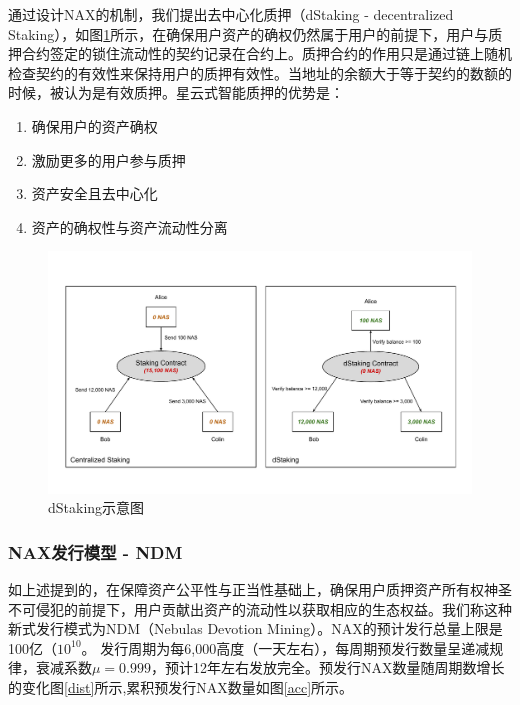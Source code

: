 通过设计NAX的机制，我们提出去中心化质押（dStaking - decentralized Staking），如图\ref{fig:dStaking}所示，在确保用户资产的确权仍然属于用户的前提下，用户与质押合约签定的锁住流动性的契约记录在合约上。质押合约的作用只是通过链上随机检查契约的有效性来保持用户的质押有效性。当地址的余额大于等于契约的数额的时候，被认为是有效质押。星云式智能质押的优势是：
\begin{enumerate}[\hspace{2cm}(a)]
    \item 确保用户的资产确权
    \item 激励更多的用户参与质押
    \item 资产安全且去中心化
    \item 资产的确权性与资产流动性分离
\end{enumerate}

\begin{figure}[htbp]
  \centering
    \includegraphics[width=1\textwidth]{../common/dStaking.pdf}
    \caption{dStaking示意图 \label{fig:dStaking}}
\end{figure}

\subsubsection{NAX发行模型 - NDM}
如上述提到的，在保障资产公平性与正当性基础上，确保用户质押资产所有权神圣不可侵犯的前提下，用户贡献出资产的流动性以获取相应的生态权益。我们称这种新式发行模式为NDM（Nebulas Devotion Mining）。NAX的预计发行总量上限是100亿（\(10^{10}\)。 发行周期为每6,000高度（一天左右），每周期预发行数量呈递减规律，衰减系数$\mu=0.999$，预计12年左右发放完全。预发行NAX数量随周期数增长的变化图\ref{dist}所示,累积预发行NAX数量如图\ref{acc}所示。

